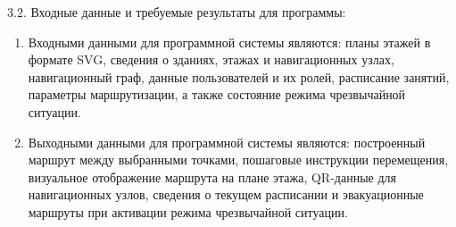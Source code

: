{\parindent0pt
  3.2. Входные данные и требуемые результаты для программы:}

\begin{enumerate}
\item Входными данными для программной системы являются: планы этажей в формате SVG, сведения о зданиях, этажах и навигационных узлах, навигационный граф, данные пользователей и их ролей, расписание занятий, параметры маршрутизации, а также состояние режима чрезвычайной ситуации.
\item Выходными данными для программной системы являются: построенный маршрут между выбранными точками, пошаговые инструкции перемещения, визуальное отображение маршрута на плане этажа, QR-данные для навигационных узлов, сведения о текущем расписании и эвакуационные маршруты при активации режима чрезвычайной ситуации.
\end{enumerate}

